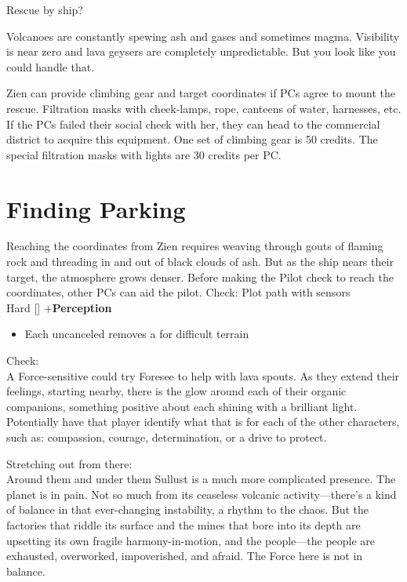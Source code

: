 \documentclass{book}
\newcommand{\df}{\difficulty}
\begin{document}
\begin{multicols}{2}
Rescue by ship? \\
\begin{quoting}
Volcanoes are constantly spewing ash and gases and sometimes magma. Visibility is near zero and lava geysers are completely unpredictable.  But you look like you could handle that.
\end{quoting}

Zien can provide climbing gear and target coordinates if PCs agree to mount the rescue. Filtration masks with cheek-lamps, rope, canteens of water, harnesses, etc. If the PCs failed their social check with her, they can head to the commercial district to acquire this equipment. One set of climbing gear is 50 credits. The special filtration masks with lights are 30 credits per PC.


\section{Finding Parking}

Reaching the coordinates from Zien requires weaving through gouts of flaming rock and threading in and out of black clouds of ash. But as the ship nears their target, the atmosphere grows denser. Before making the Pilot check to reach the coordinates, other PCs can aid the pilot.
Check: Plot path with sensors\\
Hard [\df\df\df] +\setback  \textbf{Perception}
\begin{itemize}
\item \success Each uncanceled \success removes a \setback for difficult terrain
\end{itemize}
Check:\\
A Force-sensitive could try Foresee to help with lava spouts. As they extend their feelings, starting nearby, there is the glow around each of their organic companions, something positive about each shining with a brilliant light. Potentially have that player identify what that is for each of the other characters, such as: compassion, courage, determination, or a drive to protect.

Stretching out from there: \\
Around them and under them Sullust is a much more complicated presence. The planet is in pain. Not so much from its ceaseless volcanic activity—there’s a kind of balance in that ever-changing instability, a rhythm to the chaos. But the factories that riddle its surface and the mines that bore into its depth are upsetting its own fragile harmony-in-motion, and the people—the people are exhausted, overworked, impoverished, and afraid. The Force here is not in balance.


\end{multicols}
\end{document}
